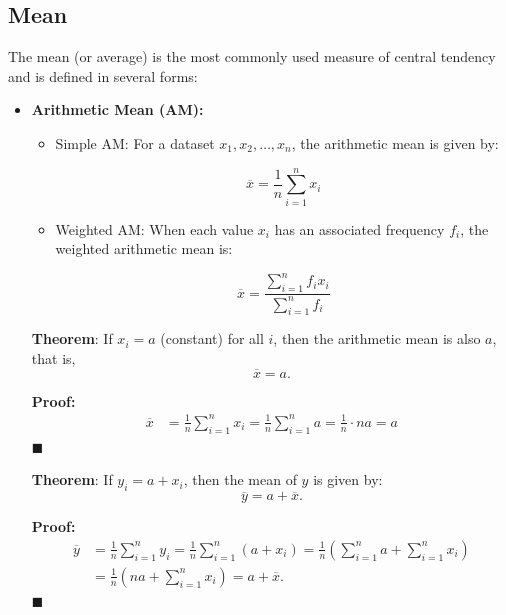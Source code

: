 \documentclass[twoside]{book}
\begin{document}
\subsection{Mean}

The mean (or average) is the most commonly used measure of central tendency and is defined in several forms:

\begin{itemize}
    \item \textbf{Arithmetic Mean (AM):}
    \begin{itemize}
        \item Simple AM: For a dataset \( x_1, x_2, \dots, x_n \), the arithmetic mean is given by:
    \begin{textbox}
    \[
    \overline{x} = \dfrac{1}{n} \sum_{i=1}^{n} x_i
    \]
    \end{textbox}
    \item Weighted AM: When each value \( x_i \) has an associated frequency \( f_i \), the weighted arithmetic mean is:
    \begin{textbox}
    \[
    \overline{x} = \dfrac{\sum_{i=1}^{n} f_i x_i}{\sum_{i=1}^{n} f_i}
    \]
    \end{textbox}
    \end{itemize}

\begin{textbox}
        \textbf{Theorem}: If \( x_i = a \) (constant) for all \( i \), then the arithmetic mean is also \( a \), that is,
\[
\overline{x} = a.
\]
\end{textbox}

\textbf{Proof:}
\begin{align*}
\overline{x} &= \frac{1}{n} \sum_{i=1}^n x_i
       = \frac{1}{n} \sum_{i=1}^n a = \frac{1}{n} \cdot n a = a
\end{align*}
\hfill $\blacksquare$

\begin{textbox}
\textbf{Theorem}: If \( y_i = a + x_i \), then the mean of \( y \) is given by:
\[
\overline{y} = a + \overline{x}.
\]
\end{textbox}

\textbf{Proof:}
\begin{align*}
\overline{y} &= \frac{1}{n} \sum_{i=1}^n y_i = \frac{1}{n} \sum_{i=1}^n (a + x_i) = \frac{1}{n} \left( \sum_{i=1}^n a + \sum_{i=1}^n x_i \right) \\
       &= \frac{1}{n} \left( n a + \sum_{i=1}^n x_i \right) = a + \overline{x}.
\end{align*}
\hfill $\blacksquare$


\end{itemize}
\end{document}
